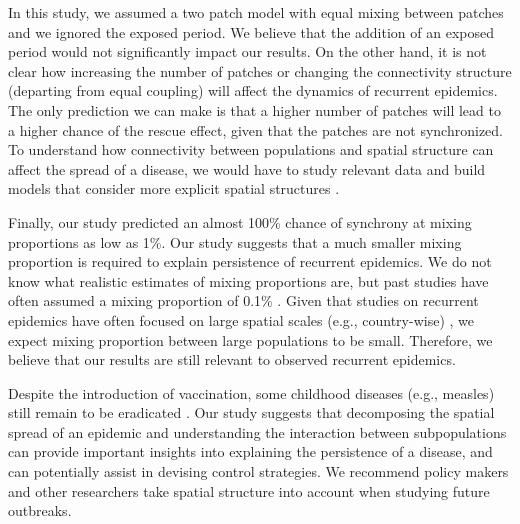 \documentclass[12pt]{article}
\begin{document}
In this study, we assumed a two patch model with equal mixing between patches and we ignored the exposed period.
We believe that the addition of an exposed period would not significantly impact our results. 
On the other hand, it is not clear how increasing the number of patches or changing the connectivity structure (departing from equal coupling) will affect the dynamics of recurrent epidemics.
The only prediction we can make is that a higher number of patches will lead to a higher chance of the rescue effect, given that the patches are not synchronized.
To understand how connectivity between populations and spatial structure can affect the spread of a disease, we would have to study relevant data and build models that consider more explicit spatial structures \cite{grenfell2001travelling, xia2004measles}.

Finally, our study predicted an almost 100\% chance of synchrony at mixing proportions as low as 1\%.
Our study suggests that a much smaller mixing proportion is required to explain persistence of recurrent epidemics.
We do not know what realistic estimates of mixing proportions are, but past studies have often assumed a mixing proportion of 0.1\% \cite{earn1998persistence, keeling2002estimating}.
Given that studies on recurrent epidemics have often focused on large spatial scales (e.g., country-wise) \cite{dalziel2016persistent}, we expect mixing proportion between large populations to be small.
Therefore, we believe that our results are still relevant to observed recurrent epidemics.

Despite the introduction of vaccination, some childhood diseases (e.g., measles) still remain to be eradicated \cite{perry2015progress}.
Our study suggests that decomposing the spatial spread of an epidemic and understanding the interaction between subpopulations can provide important insights into explaining the persistence of a disease, and can potentially assist in devising control strategies. 
We recommend policy makers and other researchers take spatial structure into account when studying future outbreaks.

\newpage


\end{document}
